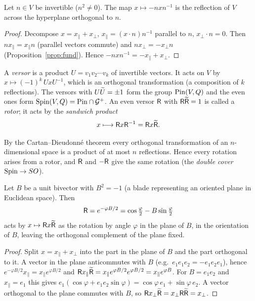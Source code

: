
\begin{theorem}[Reflections]\label{thm:refl}
Let $n\in V$ be invertible ($n^2\neq0$). The map $x\mapsto -nxn^{-1}$ is the reflection of $V$ across the hyperplane orthogonal to $n$.
\end{theorem}
\begin{proof}
Decompose $x=x_\parallel+x_\perp$, $x_\parallel=(x\cdot n)n^{-1}$ parallel to $n$, $x_\perp\cdot n=0$. Then $nx_\parallel=x_\parallel n$ (parallel vectors commute) and $nx_\perp=-x_\perp n$ (Proposition~\ref{prop:fund}). Hence
$-nxn^{-1}=-x_\parallel+x_\perp$.
\end{proof}

\begin{definition}
A \emph{versor} is a product $U=v_1v_2\cdots v_k$ of invertible vectors. It acts on $V$ by
$x\mapsto(-1)^k\,UxU^{-1}$, which is an orthogonal transformation (a composition of $k$ reflections). The versors with $U\widetilde{U}=\pm1$ form the group $\mathrm{Pin}(V,Q)$ and the even ones form $\mathrm{Spin}(V,Q)=\mathrm{Pin}\cap\mathcal{G}^+$. An even versor $\mathsf{R}$ with $\mathsf{R}\widetilde{\mathsf{R}}=1$ is called a \emph{rotor}; it acts by the \emph{sandwich product}
\[
 x\longmapsto \mathsf{R} x\mathsf{R}^{-1}=\mathsf{R} x\widetilde{\mathsf{R}}  .
\]
\end{definition}

By the Cartan--Dieudonn\'e theorem every orthogonal transformation of an $n$-dimensional space is a product of at most $n$ reflections. Hence every rotation arises from a rotor, and $\mathsf{R}$ and $-\mathsf{R}$ give the same rotation (the \emph{double cover} $\mathrm{Spin}\to SO$).

\begin{theorem}\label{thm:rotor}
Let $B$ be a unit bivector with $B^2=-1$ (a blade representing an oriented plane in Euclidean space). Then
\[
 \mathsf{R}=e^{-\varphi B/2}=\cos\tfrac\varphi2-B\sin\tfrac\varphi2
\]
acts by $x\mapsto \mathsf{R} x\widetilde{\mathsf{R}}$ as the rotation by angle $\varphi$ in the plane of $B$, in the orientation of $B$, leaving the orthogonal complement of the plane fixed.
\end{theorem}
\begin{proof}
Split $x=x_\parallel+x_\perp$ into the part in the plane of $B$ and the part orthogonal to it. A vector in the plane anticommutes with $B$ (e.g.\ $e_1e_1e_2=-e_1e_2e_1$), hence $e^{-\varphi B/2}x_\parallel=x_\parallel e^{\varphi B/2}$ and
$\mathsf{R} x_\parallel\widetilde{\mathsf{R}}=x_\parallel e^{\varphi B/2}e^{\varphi B/2}=x_\parallel e^{\varphi B}$. For $B=e_1e_2$ and $x_\parallel=e_1$ this gives $e_1(\cos\varphi+e_1e_2\sin\varphi)=\cos\varphi\,e_1+\sin\varphi\,e_2$. A vector orthogonal to the plane commutes with $B$, so $\mathsf{R} x_\perp\widetilde{\mathsf{R}}=x_\perp \mathsf{R}\widetilde{\mathsf{R}}=x_\perp$.
\end{proof}

